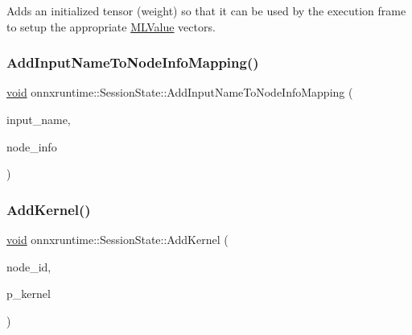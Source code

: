 Adds an initialized tensor (weight) so that it can be used by the execution frame to setup the appropriate \mbox{\hyperlink{classonnxruntime_1_1MLValue}{M\+L\+Value}} vectors. \mbox{\label{classonnxruntime_1_1SessionState_a722e9a0c30eb23911c75019157d2a156}} 
\subsubsection{\texorpdfstring{Add\+Input\+Name\+To\+Node\+Info\+Mapping()}{AddInputNameToNodeInfoMapping()}}
{\footnotesize\ttfamily \mbox{\hyperlink{mlasi_8h_a88f941d423cb2a819b70a1358982b1a6}{void}} onnxruntime\+::\+Session\+State\+::\+Add\+Input\+Name\+To\+Node\+Info\+Mapping (\begin{DoxyParamCaption}\item[{const std\+::string \&}]{input\+\_\+name,  }\item[{const \mbox{\hyperlink{structonnxruntime_1_1SessionState_1_1NodeInfo}{Node\+Info}} \&}]{node\+\_\+info }\end{DoxyParamCaption})}

\mbox{\label{classonnxruntime_1_1SessionState_aece5e3d91251079cc29d5047b641038f}} 
\subsubsection{\texorpdfstring{Add\+Kernel()}{AddKernel()}}
{\footnotesize\ttfamily \mbox{\hyperlink{mlasi_8h_a88f941d423cb2a819b70a1358982b1a6}{void}} onnxruntime\+::\+Session\+State\+::\+Add\+Kernel (\begin{DoxyParamCaption}\item[{\mbox{\hyperlink{namespaceonnxruntime_af8773b5c12b5d8fd9292eb2e268df760}{onnxruntime\+::\+Node\+Index}}}]{node\+\_\+id,  }\item[{std\+::unique\+\_\+ptr$<$ \mbox{\hyperlink{classonnxruntime_1_1OpKernel}{Op\+Kernel}} $>$}]{p\+\_\+kernel }\end{DoxyParamCaption})}

